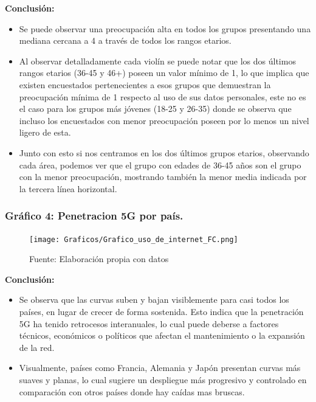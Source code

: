 \documentclass[12pt, a4paper]{article}
\begin{document}
\textbf{Conclusión:}  
\begin{itemize}
    \item Se puede observar una preocupación alta en todos los grupos presentando una mediana cercana a 4 a través de todos los rangos etarios.
    \item Al observar detalladamente cada violín se puede notar que los dos últimos rangos etarios (36-45 y 46+) poseen un valor mínimo de 1, lo que implica que existen encuestados pertenecientes a esos grupos que demuestran la preocupación mínima de 1 respecto al uso de sus datos personales, este no es el caso para los grupos más jóvenes (18-25 y 26-35) donde se observa que incluso los encuestados con menor preocupación poseen por lo menos un nivel ligero de esta.
    \item Junto con esto si nos centramos en los dos últimos grupos etarios, observando cada área, podemos ver que el grupo con edades de 36-45 años son el grupo con la menor preocupación, mostrando también la menor media indicada por la tercera línea horizontal.
\end{itemize}

\subsubsection*{Gráfico 4: Penetracion 5G por país.}
\begin{figure}[H]
    \centering
    \texttt{[image: Graficos/Grafico\_uso\_de\_internet\_FC.png]}
    \caption[6]{Fuente: Elaboración propia con datos}

\end{figure}


\textbf{Conclusión:}  
\begin{itemize}
    \item Se observa que las curvas suben y bajan visiblemente para casi todos los países, en lugar de crecer de forma sostenida. Esto indica que la penetración 5G ha tenido retrocesos interanuales, lo cual puede deberse a factores técnicos, económicos o políticos que afectan el mantenimiento o la expansión de la red.
    \item Visualmente, países como Francia, Alemania y Japón presentan curvas más suaves y planas, lo cual sugiere un despliegue más progresivo y controlado en comparación con otros países donde hay caídas mas bruscas.

\end{itemize}

\end{document}
